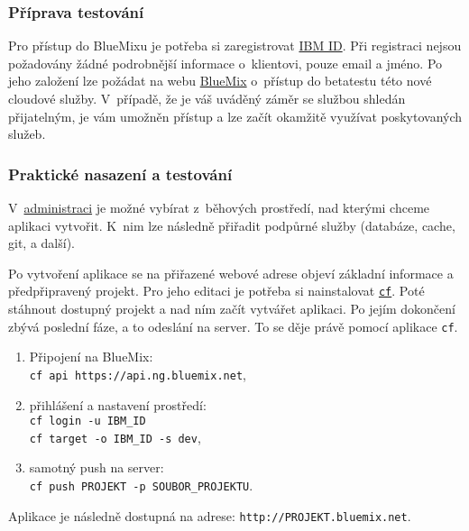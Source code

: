 \subsubsection{Příprava testování}
Pro přístup do BlueMixu je potřeba si zaregistrovat \href{https://www.ibm.com/account/profile}{IBM ID}. Při registraci nejsou požadovány žádné podrobnější informace o~klientovi, pouze email a jméno. Po jeho založení lze požádat na webu \href{https://ace.ng.bluemix.net}{BlueMix\cite{bluemix:web}} o~přístup do betatestu této nové cloudové služby. V~případě, že je váš uváděný záměr se službou shledán přijatelným, je vám umožněn přístup a lze začít okamžitě využívat poskytovaných služeb.

\subsubsection{Praktické nasazení a testování}
V~\href{https://ace.ng.bluemix.net/#/resources}{administraci} je možné vybírat z~běhových prostředí, nad kterými chceme aplikaci vytvořit. K~nim lze následně přiřadit podpůrné služby (databáze, cache, git, a další).

Po vytvoření aplikace se na přiřazené webové adrese objeví základní informace a předpřipravený projekt. Pro jeho editaci je potřeba si nainstalovat \href{https://www.ng.bluemix.net/docs/BuildingWeb.jsp#install-cf}{\texttt{cf}}. Poté stáhnout dostupný projekt a nad ním začít vytvářet aplikaci. Po jejím dokončení zbývá poslední fáze, a to odeslání na server. To se děje právě pomocí aplikace \texttt{cf}.
\begin{enumerate}
	\item Připojení na BlueMix:\\
		\texttt{cf api https://api.ng.bluemix.net},
	\item přihlášení a nastavení prostředí:\\
		\texttt{cf login -u IBM\_ID}\\
		\texttt{cf target -o IBM\_ID -s dev},
	\item samotný push na server:\\
		\texttt{cf push PROJEKT -p SOUBOR\_PROJEKTU}.
\end{enumerate}

Aplikace je následně dostupná na adrese: \texttt{http://PROJEKT.bluemix.net}.

